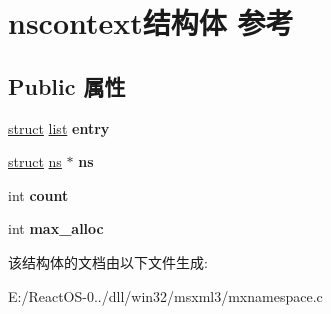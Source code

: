 \hypertarget{structnscontext}{}\section{nscontext结构体 参考}
\label{structnscontext}
\subsection*{Public 属性}
\begin{DoxyCompactItemize}
\item 
\mbox{\label{structnscontext_a75340672b743543ccc7d7597d0f62a13}} 
\hyperlink{interfacestruct}{struct} \hyperlink{classlist}{list} {\bfseries entry}
\item 
\mbox{\label{structnscontext_a470c79cf060b223fe9bfd50d6785378f}} 
\hyperlink{interfacestruct}{struct} \hyperlink{structns}{ns} $\ast$ {\bfseries ns}
\item 
\mbox{\label{structnscontext_ae751a5530567fe25a649289414fd11ca}} 
int {\bfseries count}
\item 
\mbox{\label{structnscontext_aa65e75b7bef856fe2220d19ad6a93938}} 
int {\bfseries max\+\_\+alloc}
\end{DoxyCompactItemize}


该结构体的文档由以下文件生成\+:\begin{DoxyCompactItemize}
\item 
E\+:/\+React\+O\+S-\/0../dll/win32/msxml3/mxnamespace.\+c\end{DoxyCompactItemize}
